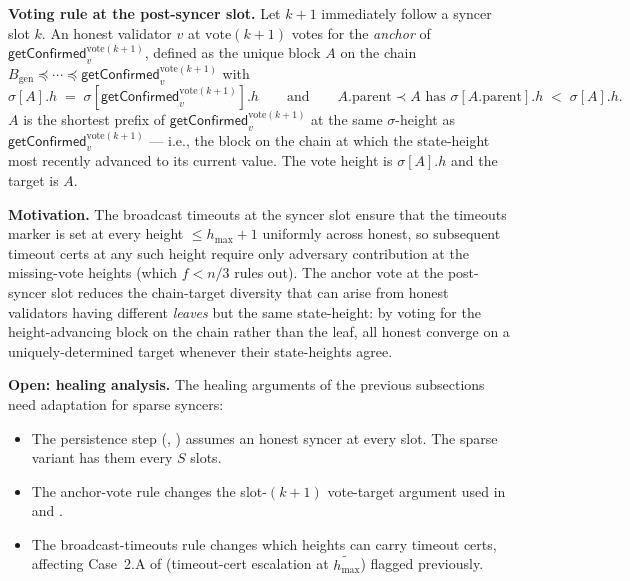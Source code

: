 \documentclass{article}
\newcommand{\genesis}{\ensuremath{B_{\mathrm{gen}}}}
\newcommand{\hmax}{\ensuremath{h_{\max}}\xspace}
\newcommand{\vote}{\ensuremath{\mathrm{vote}}}
\newcommand{\comm}[1]{\ensuremath{\widetilde{#1}}}
\newcommand{\getConfirmed}{\textsf{getConfirmed}\xspace}
\renewcommand{\paragraph}[1]{\vspace{7pt}\noindent\textbf{#1}}
\theoremstyle{plain}
\theoremstyle{definition}
\theoremstyle{remark}
\begin{document}
\paragraph{Voting rule at the post-syncer slot.}
Let $k+1$ immediately follow a syncer slot $k$. An honest validator $v$ at $\vote(k+1)$ votes for the \emph{anchor} of $\getConfirmed_v^{\vote(k+1)}$, defined as the unique block $A$ on the chain $\genesis \preceq \cdots \preceq \getConfirmed_v^{\vote(k+1)}$ with
\[
  \sigma[A].h \;=\; \sigma[\getConfirmed_v^{\vote(k+1)}].h
  \qquad\text{and}\qquad
  A.\mathrm{parent} \prec A \text{ has } \sigma[A.\mathrm{parent}].h \;<\; \sigma[A].h.
\]
$A$ is the shortest prefix of $\getConfirmed_v^{\vote(k+1)}$ at the same $\sigma$-height as $\getConfirmed_v^{\vote(k+1)}$ --- i.e., the block on the chain at which the state-height most recently advanced to its current value.
The vote height is $\sigma[A].h$ and the target is $A$.

\paragraph{Motivation.}
The broadcast timeouts at the syncer slot ensure that the timeouts marker is set at every height $\leq \hmax+1$ uniformly across honest, so subsequent timeout certs at any such height require only adversary contribution at the missing-vote heights (which $f < n/3$ rules out).
The anchor vote at the post-syncer slot reduces the chain-target diversity that can arise from honest validators having different \emph{leaves} but the same state-height: by voting for the height-advancing block on the chain rather than the leaf, all honest converge on a uniquely-determined target whenever their state-heights agree.

\paragraph{Open: healing analysis.}
The healing arguments of the previous subsections need adaptation for sparse syncers:
\begin{itemize}
  \item The persistence step (, ) assumes an honest syncer at every slot. The sparse variant has them every $S$ slots.
  \item The anchor-vote rule changes the slot-$(k+1)$ vote-target argument used in  and .
  \item The broadcast-timeouts rule changes which heights can carry timeout certs, affecting Case~2.A of  (timeout-cert escalation at $\comm{\hmax}$) flagged previously.
\end{itemize}
\end{document}
